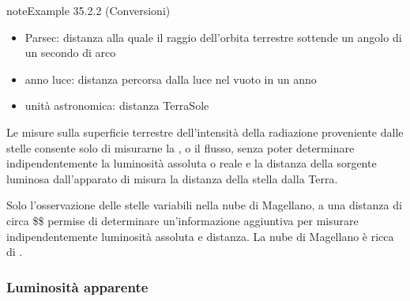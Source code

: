 \documentclass[letterpaper,10pt,italian]{jupyterBook}
\begin{document}
\label{ch/modern/astronomy-distance-ladder:example-1}
\begin{sphinxadmonition}{note}{Example 35.2.2 (Conversioni)}


\begin{itemize}
\item {} 
\sphinxAtStartPar
Parsec: distanza alla quale il raggio dell’orbita terrestre sottende un angolo di un secondo di arco

\item {} 
\sphinxAtStartPar
anno luce: distanza percorsa dalla luce nel vuoto in un anno

\item {} 
\sphinxAtStartPar
unità astronomica: distanza Terra\sphinxhyphen{}Sole

\end{itemize}
\end{sphinxadmonition}

\sphinxAtStartPar
Le misure sulla superficie terrestre dell’intensità della radiazione proveniente dalle stelle consente solo di misurarne la , o il flusso, senza poter determinare indipendentemente la luminosità assoluta \sphinxhyphen{} o reale \sphinxhyphen{}  e la distanza della sorgente luminosa dall’apparato di misura \sphinxhyphen{} la distanza della stella dalla Terra.

\sphinxAtStartPar
Solo l’osservazione delle stelle variabili nella nube di Magellano, a una distanza di circa \$\$ permise di determinare un’informazione aggiuntiva per misurare indipendentemente luminosità assoluta e distanza. La nube di Magellano è ricca di .
\subsubsection*{Luminosità apparente}
\end{document}
